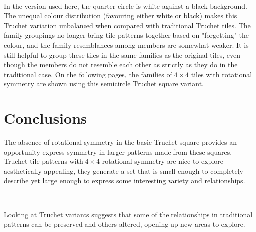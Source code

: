 \documentclass{tufte-book}
\begin{document}
\,
\vspace{0.2cm}

\noindent
In the version used here, the quarter circle is  white against a black background. The unequal colour distribution (favouring either white or black) makes this Truchet variation unbalanced when compared with traditional Truchet tiles. The family groupings no longer bring tile patterns together based on "forgetting" the colour, and the family resemblances among members are somewhat weaker. It is still helpful to group these tiles in the same families as the original tiles, even though the members do not resemble each other as strictly as they do in the traditional case. On the following pages, the families of $4\times4$  tiles with rotational symmetry are shown using this semicircle Truchet square variant.

\newpage



\chapter{Conclusions}

\noindent
The absence of rotational symmetry in the basic Truchet square provides an opportunity express symmetry in larger patterns made from these squares. Truchet tile patterns with $4\times 4$ rotational symmetry are nice to explore - aesthetically appealing, they generate a set that is small enough to completely describe yet large enough to express some interesting variety and relationships.

\,
\vspace{0.4cm}

\noindent
Looking at Truchet variants suggests that some of the relationships in traditional patterns can be preserved and others altered, opening up new areas to explore.

\backmatter
\nocite{*}


\end{document}
